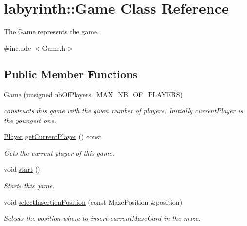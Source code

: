 \hypertarget{classlabyrinth_1_1_game}{}\section{labyrinth\+::Game Class Reference}
\label{classlabyrinth_1_1_game}


The \mbox{\hyperlink{classlabyrinth_1_1_game}{Game}} represents the game.  




{\ttfamily \#include $<$Game.\+h$>$}

\subsection*{Public Member Functions}
\begin{DoxyCompactItemize}
\item 
\mbox{\hyperlink{classlabyrinth_1_1_game_acc1b27a7dbaba790dba67bcfd4783479}{Game}} (unsigned nb\+Of\+Players=\mbox{\hyperlink{classlabyrinth_1_1_game_ab9f172b0ca2a0332163b7dbdbb45775a}{M\+A\+X\+\_\+\+N\+B\+\_\+\+O\+F\+\_\+\+P\+L\+A\+Y\+E\+RS}})
\begin{DoxyCompactList}\small\item\em constructs this game with the given number of players. Initially current\+Player is the youngest one. \end{DoxyCompactList}\item 
\mbox{\hyperlink{structlabyrinth_1_1_player}{Player}} \mbox{\hyperlink{classlabyrinth_1_1_game_a9d7dacde88c7cfde1e1414eb35e4e2a6}{get\+Current\+Player}} () const
\begin{DoxyCompactList}\small\item\em Gets the current player of this game. \end{DoxyCompactList}\item 
\mbox{\label{classlabyrinth_1_1_game_a313b3b5581c63167c2e081e32d5327cb}} 
void \mbox{\hyperlink{classlabyrinth_1_1_game_a313b3b5581c63167c2e081e32d5327cb}{start}} ()
\begin{DoxyCompactList}\small\item\em Starts this game. \end{DoxyCompactList}\item 
void \mbox{\hyperlink{classlabyrinth_1_1_game_a4c0715b9d9307fde5fb026d6acf8acc9}{select\+Insertion\+Position}} (const Maze\+Position \&position)
\begin{DoxyCompactList}\small\item\em Selects the position where to insert current\+Maze\+Card in the maze. \end{DoxyCompactList}\item 

\end{DoxyCompactItemize}

